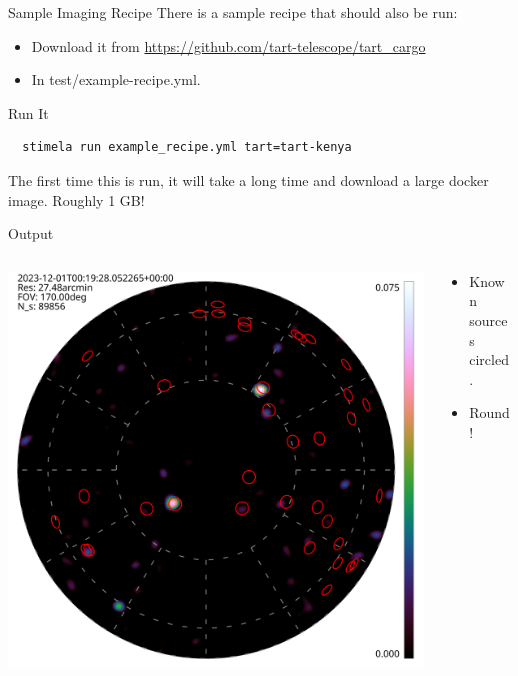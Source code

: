 \documentclass[ignorenonframetext]{beamer}
\begin{document}
\begin{frame}[fragile]{Sample Imaging Recipe}
There is a sample recipe that should also be run:
\begin{itemize}
 \item Download it from \url{https://github.com/tart-telescope/tart_cargo}
 \item In test/example-recipe.yml.
\end{itemize}
\begin{block}{Run It}
 \begin{verbatim}
  stimela run example_recipe.yml tart=tart-kenya
 \end{verbatim}
\end{block}
 The first time this is run, it will take a long time and download a large docker image. Roughly 1 GB!
\end{frame}

\begin{frame}{Output}
\begin{columns}
 \begin{column}{0.7\linewidth}
\includegraphics[width=\linewidth]{images/obs_00000.hdf.png}
 \end{column}
 \begin{column}{0.3\linewidth}
 \begin{itemize}
  \item Known sources circled.
  \item Round!
 \end{itemize}
 \end{column}
\end{columns}
\end{frame}
\end{document}
